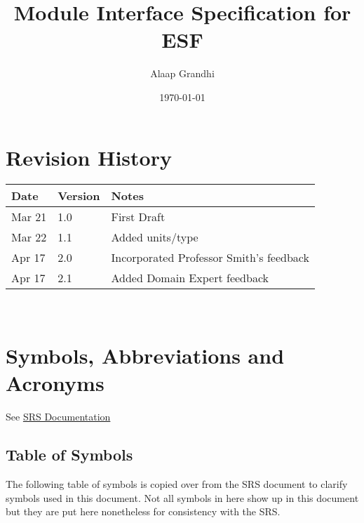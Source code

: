 \documentclass[12pt, titlepage]{article}
\newcommand{\ProjectName}{ESF}
\begin{document}
\title{Module Interface Specification for \ProjectName{}}

\author{Alaap Grandhi}

\date{\today}

\maketitle


\section{Revision History}

\begin{tabularx}{\textwidth}{p{3cm}p{2cm}X}
\toprule {\bf Date} & {\bf Version} & {\bf Notes}\\
\midrule
Mar 21 & 1.0 & First Draft\\
Mar 22 & 1.1 & Added units/type\\
Apr 17 & 2.0 & Incorporated Professor Smith's feedback \\
Apr 17 & 2.1 & Added Domain Expert feedback\\
\bottomrule
\end{tabularx}

~\newpage

\section{Symbols, Abbreviations and Acronyms}

See \href{https://github.com/alaapgrandhi/equivariant-sensor-fusion/tree/main/docs/SRS}{SRS Documentation} 

\subsection{Table of Symbols}

The following table of symbols is copied over from the SRS document to clarify symbols used in this document. Not all symbols in here show up in this document but they are put here nonetheless for consistency with the SRS.
\end{document}

